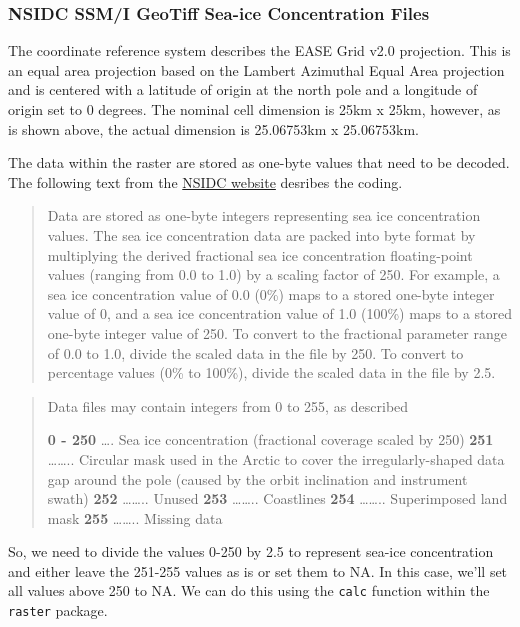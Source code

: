 \documentclass[]{article}
\begin{document}
\subsubsection{NSIDC SSM/I GeoTiff Sea-ice Concentration Files}

The coordinate reference system describes the EASE Grid v2.0 projection.
This is an equal area projection based on the Lambert Azimuthal Equal
Area projection and is centered with a latitude of origin at the north
pole and a longitude of origin set to 0 degrees. The nominal cell
dimension is 25km x 25km, however, as is shown above, the actual
dimension is 25.06753km x 25.06753km.

The data within the raster are stored as one-byte values that need to be
decoded. The following text from the
\href{http://nsidc.org/data/docs/daac/nsidc0051\_gsfc\_seaice.gd.html\#paramrange}{NSIDC
website} desribes the coding.

\begin{quote}
Data are stored as one-byte integers representing sea ice concentration
values. The sea ice concentration data are packed into byte format by
multiplying the derived fractional sea ice concentration floating-point
values (ranging from 0.0 to 1.0) by a scaling factor of 250. For
example, a sea ice concentration value of 0.0 (0\%) maps to a stored
one-byte integer value of 0, and a sea ice concentration value of 1.0
(100\%) maps to a stored one-byte integer value of 250. To convert to
the fractional parameter range of 0.0 to 1.0, divide the scaled data in
the file by 250. To convert to percentage values (0\% to 100\%), divide
the scaled data in the file by 2.5.
\end{quote}

\begin{quote}
Data files may contain integers from 0 to 255, as described

\textbf{0 - 250} \ldots{}. Sea ice concentration (fractional coverage
scaled by 250) \textbf{251} \ldots{}\ldots{}.. Circular mask used in the
Arctic to cover the irregularly-shaped data gap around the pole (caused
by the orbit inclination and instrument swath) \textbf{252}
\ldots{}\ldots{}.. Unused \textbf{253} \ldots{}\ldots{}.. Coastlines
\textbf{254} \ldots{}\ldots{}.. Superimposed land mask \textbf{255}
\ldots{}\ldots{}.. Missing data
\end{quote}

So, we need to divide the values 0-250 by 2.5 to represent sea-ice
concentration and either leave the 251-255 values as is or set them to
NA. In this case, we'll set all values above 250 to NA. We can do this
using the \texttt{calc} function within the \texttt{raster} package.
\end{document}
